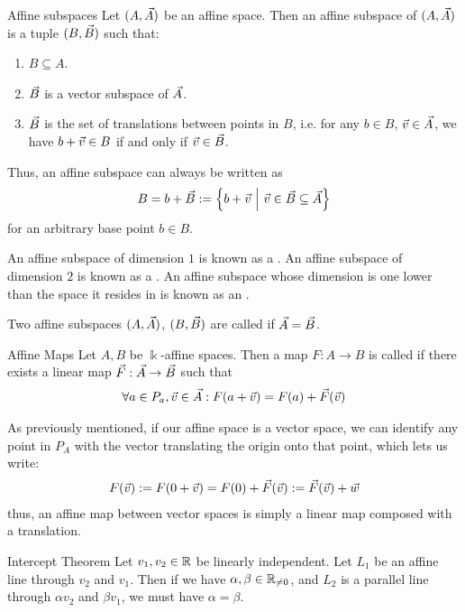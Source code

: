 \begin{importantdefinition}{Affine subspaces}{}
	Let $(A, \vec{A})$ be an affine space. Then an affine subspace of $(A, \vec{A})$ is a tuple $(B, \vec{B})$ such that:
	\begin{enumerate}
		\item $B \subseteq A$.
		\item $\vec{B}$ is a vector subspace of $\vec{A}$.
		\item $\vec{B}$ is the set of translations between points in $B$, i.e. for any $b \in B$, $\vec{v} \in \vec{A}$, we have $b + \vec{v} \in B$ if and only if $\vec{v} \in \vec{B}$.
	\end{enumerate}
	Thus, an affine subspace can always be written as
	\begin{align*}
		B = b + \vec{B} := \qty{b + \vec{v}~\middle|~\vec{v}\in \vec{B}\subseteq \vec{A}}
	\end{align*}
	for an arbitrary base point $b \in B$.
\end{importantdefinition}
An affine subspace of dimension $1$ is known as a . An affine subspace of dimension $2$ is known as a . An affine subspace whose dimension is one lower than the space it resides in is known as an .
\begin{definition}
	Two affine subspaces $(A, \vec{A})$, $(B, \vec{B})$ are called  if $\vec{A} = \vec{B}$.
\end{definition}
\begin{importantdefinition}{Affine Maps}{}
	Let $A,B$ be $\Bbbk$-affine spaces. Then a map $F : A \to B$ is called  if there exists a linear map $\vec{F} : \vec{A} \to \vec{B}$ such that
	\begin{align*}
		\forall a \in P_a, \vec{v} \in \vec{A}:
		F(a + \vec{v}) = F(a) + \vec{F}(\vec{v})
	\end{align*}
\end{importantdefinition}
As previously mentioned, if our affine space is a vector space, we can identify any point in $P_A$ with the vector translating the origin onto that point, which lets us write:
\begin{align*}
	F(\vec{v}) := F(0 + \vec{v}) = F(0) + \vec{F}(\vec{v}) := \vec{F}(\vec{v}) + \vec{w}
\end{align*}
thus, an affine map between vector spaces is simply a linear map composed with a translation.
\begin{importanttheorem}{Intercept Theorem}{}
	Let $v_1, v_2 \in \mathbb{R}$ be linearly independent. Let $L_1$ be an affine line through $v_2$ and $v_1$. Then if we have $\alpha, \beta \in \mathbb{R}_{\neq 0}$, and $L_2$ is a parallel line through $\alpha v_2$ and $\beta v_1$, we must have $\alpha = \beta$.
\end{importanttheorem}
